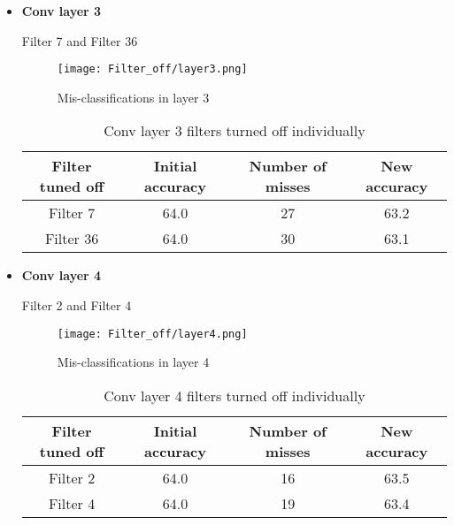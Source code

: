 \documentclass{article}
\begin{document}
\begin{itemize}
\newpage       
    \item \textbf{Conv layer 3}
        
         Filter 7 and Filter 36
        
        \begin{figure}[H]
            \centering
            \texttt{[image: Filter\_off/layer3.png]}
            \vspace{-2.0em}
            \caption{Mis-classifications in layer 3}
            \label{fig:l3_m1}
        \end{figure}
        
        \begin{table}[h!]
        \begin{center}
         \begin{tabular}{||c | c c c||}         
         \hline
        Filter tuned off & Initial accuracy  &  Number of misses &  New accuracy\\ [0.5ex] 
         \hline\hline
             Filter 7 & 64.0 & 27 & 63.2\\
             \hline
             Filter 36 & 64.0 & 30 & 63.1\\
         \hline
         \end{tabular}
        \end{center}
        \label{table:conv3_off}
        \vspace{-1.0em}
        \caption{Conv layer 3 filters turned off individually} 
        \end{table}
        
    \item \textbf{Conv layer 4}
    
        Filter 2 and Filter 4

        \begin{figure}[H]
            \centering
            \texttt{[image: Filter\_off/layer4.png]}
            \vspace{-2.0em}
            \caption{Mis-classifications in layer 4}
            \label{fig:l4_m1}
        \end{figure}
        
        \begin{table}[h!]
        \begin{center}
         \begin{tabular}{||c | c c c||}         
         \hline
        Filter tuned off & Initial accuracy  &  Number of misses &  New accuracy\\ [0.5ex] 
         \hline\hline
             Filter 2 & 64.0 & 16 & 63.5\\
             \hline
             Filter 4 & 64.0 & 19 & 63.4\\
         \hline
         \end{tabular}
        \end{center}
        \label{table:conv4_off}
        \vspace{-1.0em}
        \caption{Conv layer 4 filters turned off individually} 
        \end{table}
\newpage       
        

\end{itemize}
\end{document}
